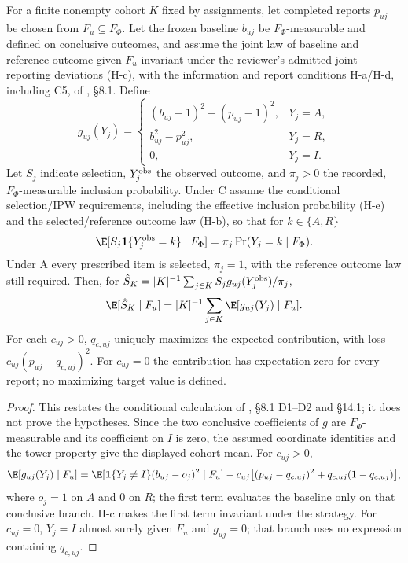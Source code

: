 \begin{proposition}\label{prop:ipw}\proved{}
For a finite nonempty cohort $K$ fixed by assignments, let completed reports $p_{uj}$ be chosen
from $F_u\subseteq F_\Phi$. Let the frozen baseline $b_{uj}$ be $F_\Phi$-measurable
and defined on conclusive outcomes,
and assume the joint law of baseline and reference outcome given $F_u$ invariant under the
reviewer's admitted joint reporting deviations (H-c), with the information and report
conditions H-a/H-d,
including C5, of , \S8.1. Define
\[
 g_{uj}(Y_j)=
 \begin{cases}
 (b_{uj}-1)^2-(p_{uj}-1)^2,&Y_j=A,\\
 b_{uj}^2-p_{uj}^2,&Y_j=R,\\
 0,&Y_j=I.
 \end{cases}
\]
Let $S_j$ indicate selection, $Y_j^{\rm obs}$ the observed outcome, and $\pi_j>0$ the
recorded, $F_\Phi$-measurable inclusion probability. Under C assume the conditional
selection/IPW requirements, including the effective inclusion probability (H-e) and the
selected/reference outcome law (H-b), so that for $k\in\{A,R\}$
\[
 \E[S_j\mathbf{1}\{Y_j^{\rm obs}=k\}\mid F_\Phi]
   =\pi_j\Pr(Y_j=k\mid F_\Phi).
\]
Under A every prescribed item is selected, $\pi_j=1$, with the reference outcome law still
required. Then, for $\hat S_K=|K|^{-1}\sum_{j\in K}S_jg_{uj}(Y_j^{\rm obs})/\pi_j$,
\[
 \E[\hat S_K\mid F_u]=|K|^{-1}\sum_{j\in K}\E[g_{uj}(Y_j)\mid F_u].
\]
For each $c_{uj}>0$, $q_{c,uj}$ uniquely maximizes the expected contribution, with loss
$c_{uj}(p_{uj}-q_{c,uj})^2$. For $c_{uj}=0$ the contribution has expectation zero for
every report; no maximizing target value is defined.
\end{proposition}
\begin{proof}
This restates the conditional calculation of , \S8.1 D1--D2 and \S14.1;
it does not prove the hypotheses. Since the two conclusive coefficients of $g$ are
$F_\Phi$-measurable and its coefficient on $I$ is zero, the assumed coordinate identities
and the tower property give the displayed cohort mean. For $c_{uj}>0$,
\[
 \E[g_{uj}(Y_j)\mid F_u]
 =\E[\mathbf{1}\{Y_j\ne I\}(b_{uj}-o_j)^2\mid F_u]
 -c_{uj}\bigl[(p_{uj}-q_{c,uj})^2+q_{c,uj}(1-q_{c,uj})\bigr],
\]
where $o_j=1$ on $A$ and $0$ on $R$; the first term evaluates the baseline only on that
conclusive branch. H-c makes the first term invariant under the
strategy. For $c_{uj}=0$, $Y_j=I$ almost surely given $F_u$ and $g_{uj}=0$;
that branch uses no expression containing $q_{c,uj}$.
\end{proof}

